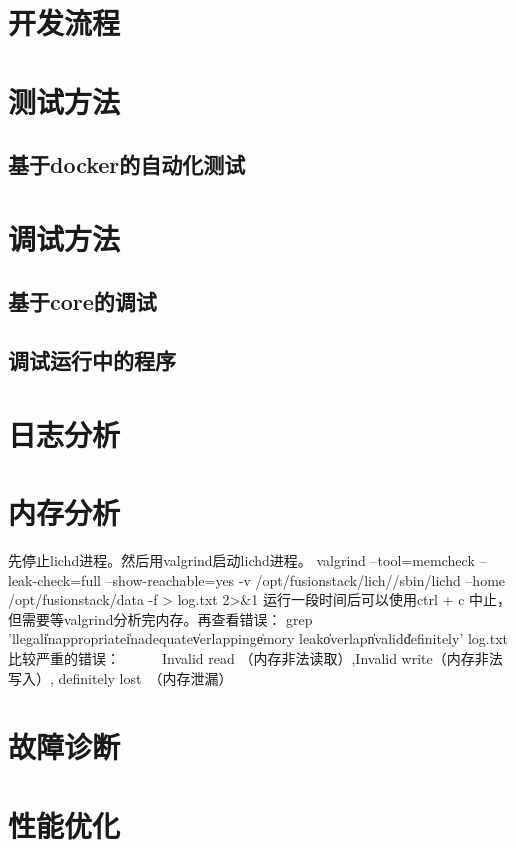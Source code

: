 \section{开发流程}

\section{测试方法}

\subsection{基于docker的自动化测试}

\section{调试方法}

\subsection{基于core的调试}
\subsection{调试运行中的程序}

\section{日志分析}

\section{内存分析}

先停止lichd进程。然后用valgrind启动lichd进程。
valgrind --tool=memcheck --leak-check=full --show-reachable=yes -v  /opt/fusionstack/lich//sbin/lichd --home /opt/fusionstack/data -f  > log.txt 2>&1
运行一段时间后可以使用ctrl + c 中止，但需要等valgrind分析完内存。再查看错误：
grep 'llegal\|inappropriate\|inadequate\|verlapping\|emory leak\|overlap\|nvalid\|definitely' log.txt
比较严重的错误：　　　Invalid read （内存非法读取）,Invalid write（内存非法写入）, definitely lost　（内存泄漏）

\section{故障诊断}

\section{性能优化}
